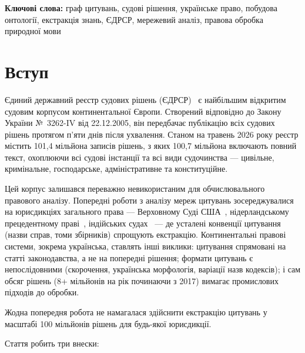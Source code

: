 \documentclass[11pt]{article}
\begin{document}
\medskip
\noindent\textbf{Ключові слова:} граф цитувань, судові рішення, українське право, побудова онтології, екстракція знань, ЄДРСР, мережевий аналіз, правова обробка природної мови


\section{Вступ}
\label{sec:intro}

Єдиний державний реєстр судових рішень (ЄДРСР)~\citep{edrsr2024} є найбільшим відкритим судовим корпусом континентальної Європи.
Створений відповідно до Закону України №~3262-IV від 22.12.2005, він передбачає публікацію всіх судових рішень протягом п'яти днів після ухвалення.
Станом на травень 2026 року реєстр містить 101,4 мільйона записів рішень, з яких 100,7 мільйона включають повний текст, охоплюючи всі судові інстанції та всі види судочинства --- цивільне, кримінальне, господарське, адміністративне та конституційне.

Цей корпус залишався переважно невикористаним для обчислювального правового аналізу.
Попередні роботи з аналізу мереж цитувань зосереджувалися на юрисдикціях загального права --- Верховному Суді США~\citep{fowler2007network}, нідерландському прецедентному праві~\citep{winkels2012determining}, індійських судах~\citep{kumar2022citationnet} --- де усталені конвенції цитування (назви справ, томи збірників) спрощують екстракцію.
Континентальні правові системи, зокрема українська, ставлять інші виклики: цитування спрямовані на статті законодавства, а не на попередні рішення; формати цитувань є непослідовними (скорочення, українська морфологія, варіації назв кодексів); і сам обсяг рішень (8+ мільйонів на рік починаючи з 2017) вимагає промислових підходів до обробки.

Жодна попередня робота не намагалася здійснити екстракцію цитувань у масштабі 100 мільйонів рішень для будь-якої юрисдикції.

Стаття робить три внески:
\end{document}
